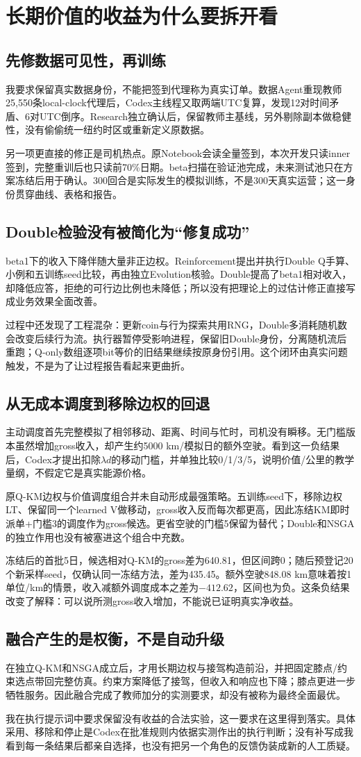 \section{长期价值的收益为什么要拆开看}
\subsection{先修数据可见性，再训练}
我要求保留真实数据身份，不能把签到代理称为真实订单。数据Agent重现教师25,550条local-clock代理后，Codex主线程又取两端UTC复算，发现12对时间矛盾、6对UTC倒序。Research独立确认后，保留教师主基线，另外剔除副本做稳健性，没有偷偷统一纽约时区或重新定义原数据。

另一项更直接的修正是司机热点。原Notebook会读全量签到，本次开发只读inner签到，完整重训后也只读前70\%日期。beta扫描在验证池完成，未来测试池只在方案冻结后用于确认。300回合是实际发生的模拟训练，不是300天真实运营；这一身份贯穿曲线、表格和报告。

\subsection{Double检验没有被简化为“修复成功”}
beta1下的收入下降伴随大量非正边权。Reinforcement提出并执行Double Q手算、小例和五训练seed比较，再由独立Evolution核验。Double提高了beta1相对收入，却降低应答，拒绝的可行边比例也未降低；所以没有把理论上的过估计修正直接写成业务效果全面改善。

过程中还发现了工程混杂：更新coin与行为探索共用RNG，Double多消耗随机数会改变后续行为流。执行器暂停受影响进程，保留旧Double身份，分离随机流后重跑；Q-only数组逐项bit等价的旧结果继续按原身份引用。这个闭环由真实问题触发，不是为了让过程报告看起来更曲折。

\subsection{从无成本调度到移除边权的回退}
主动调度首先完整模拟了相邻移动、距离、时间与忙时，司机没有瞬移。无门槛版本虽然增加gross收入，却产生约5000 km/模拟日的额外空驶。看到这一负结果后，Codex才提出扣除$\lambda d$的移动门槛，并单独比较0/1/3/5，说明价值/公里的教学量纲，不假定它是真实能源价格。

原Q-KM边权与价值调度组合并未自动形成最强策略。五训练seed下，移除边权LT、保留同一个learned V做移动，gross收入反而每次都更高，因此冻结KM即时派单+门槛3的调度作为gross候选。更省空驶的门槛5保留为替代；Double和NSGA的独立作用也没有被塞进这个组合中充数。

冻结后的首批5日，候选相对Q-KM的gross差为640.81，但区间跨0；随后预登记20个新采样seed，仅确认同一冻结方法，差为435.45。额外空驶848.08 km意味着按1单位/km的情景，收入减额外调度成本之差为$-412.62$，区间也为负。这条负结果改变了解释：可以说所测gross收入增加，不能说已证明真实净收益。

\subsection{融合产生的是权衡，不是自动升级}
在独立Q-KM和NSGA成立后，才用长期边权与接驾构造前沿，并把固定膝点/约束选点带回完整仿真。约束方案降低了接驾，但收入和响应也下降；膝点更进一步牺牲服务。因此融合完成了教师加分的实测要求，却没有被称为最终全面最优。

我在执行提示词中要求保留没有收益的合法实验，这一要求在这里得到落实。具体采用、移除和停止是Codex在批准规则内依据实测作出的执行判断；没有补写成我看到每一条结果后都亲自选择，也没有把另一个角色的反馈伪装成新的人工质疑。
